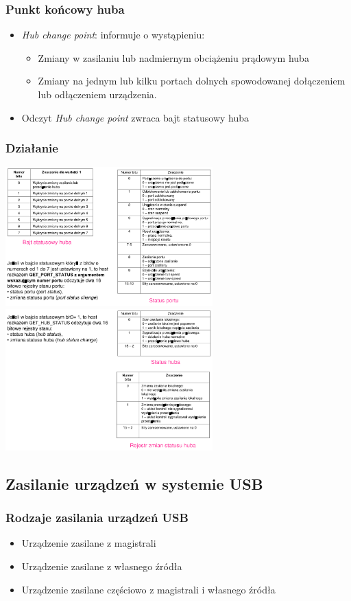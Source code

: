 \documentclass[a4paper,twoside]{article}
\begin{document}
	\subsubsection{Punkt końcowy huba}
	\begin{itemize}
		\item \emph{Hub change point}: informuje o wystąpieniu:
		\begin{itemize}
			\item Zmiany w zasilaniu lub nadmiernym obciążeniu prądowym huba
			\item Zmiany na jednym lub kilku portach dolnych spowodowanej dołączeniem lub odłączeniem urządzenia.
		\end{itemize}
		\item Odczyt \emph{Hub change point} zwraca bajt statusowy huba
	\end{itemize}
	\subsubsection{Działanie}
	\includegraphics[width=8cm]{./wyklady/USB_35_1.pdf}
	\includegraphics[width=8cm]{./wyklady/USB_36_1.pdf}
	
\subsection{Zasilanie urządzeń w systemie USB}
	\subsubsection{Rodzaje zasilania urządzeń USB}
	\begin{itemize}
		\item Urządzenie zasilane z magistrali
		\item Urządzenie zasilane z własnego źródła
		\item Urządzenie zasilane częściowo z magistrali i własnego źródła
	\end{itemize}
\end{document}
